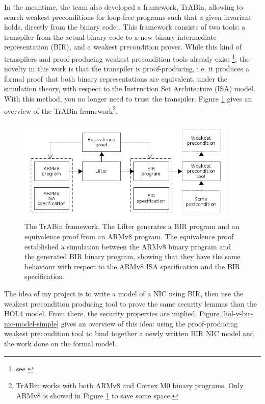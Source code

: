 \documentclass{kththesis}
\begin{document}
In the meantime, the team also developed a framework, TrABin, allowing to search weakest preconditions for loop-free programs such that a given invariant holds, directly from the binary code \cite{lindner_trabin:_2019}. This framework consists of two tools: a transpiler from the actual binary code to a new binary intermediate representation (BIR), and a weakest precondition prover. While this kind of transpilers and proof-producing weakest precondition tools already exist \footnote{see \cite{lindner_trabin:_2019}}, the novelty in this work is that the transpiler is proof-producing, i.e. it produces a formal proof that both binary representations are equivalent, under the simulation theory, with respect to the Instruction Set Architecture (ISA) model. With this method, you no longer need to trust the transpiler. Figure \ref{trabin-overview} gives an overview of the TrABin framework\footnote{TrABin works with both ARMv8 and Cortex M0 binary programs. Only ARMv8 is showed in Figure \ref{trabin-overview} to save some space.}.

\begin{figure}[!ht]
	\includegraphics[height=5cm]{figures/trabin-overview.png}
	\centering
	\caption{
The TrABin framework. The Lifter generates a BIR program and an equivalence proof from an ARMv8 program. The equivalence proof established a simulation between the ARMv8 binary program and the generated BIR binary program, showing that they have the same behaviour with respect to the ARMv8 ISA specification and the BIR specification.
}
	\label{trabin-overview}
\end{figure}

The idea of my project is to write a model of a NIC using BIR, then use the weakest precondition producing tool to prove the same security lemmas than the HOL4 model. From there, the security properties are implied. Figure \ref{hol-v-bir-nic-model-simple} gives an overview of this idea: using the proof-producing weakest precondition tool to bind together a newly written BIR NIC model and the work done on the formal model.
\end{document}
